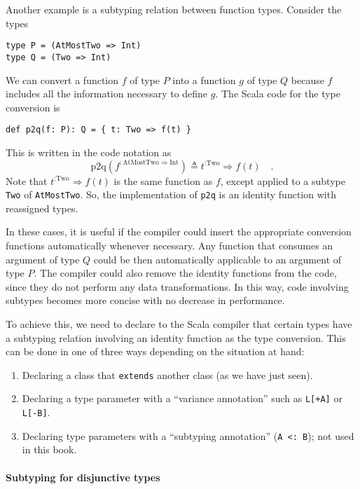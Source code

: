 Another example is a subtyping relation between function types. Consider
the types
\begin{lstlisting}
type P = (AtMostTwo => Int)
type Q = (Two => Int)
\end{lstlisting}
We can convert a function $f$ of type $P$ into a function $g$ of
type $Q$ because $f$ includes all the information necessary to define
$g$. The Scala code for the type conversion is
\begin{lstlisting}
def p2q(f: P): Q = { t: Two => f(t) }
\end{lstlisting}
This is written in the code notation as
\[
\text{p2q}(f^{:\text{AtMostTwo}\Rightarrow\text{Int}})\triangleq t^{:\text{Two}}\Rightarrow f(t)\quad.
\]
Note that $t^{:\text{Two}}\Rightarrow f(t)$ is the same function
as $f$, except applied to a subtype \lstinline!Two! of \lstinline!AtMostTwo!.
So, the implementation of \lstinline!p2q! is an identity function
with reassigned types.

In these cases, it is useful if the compiler could insert the appropriate
conversion functions automatically whenever necessary. Any function
that consumes an argument of type $Q$ could be then automatically
applicable to an argument of type $P$. The compiler could also remove
the identity functions from the code, since they do not perform any
data transformations. In this way, code involving subtypes becomes
more concise with no decrease in performance.

To achieve this, we need to declare to the Scala compiler that certain
types have a subtyping relation involving an identity function as
the type conversion. This can be done in one of three ways depending
on the situation at hand:
\begin{enumerate}
\item Declaring a class that \lstinline!extends! another class (as we have
just seen).
\item Declaring a type parameter with a ``variance annotation'' such as
\lstinline!L[+A]! or \lstinline!L[-B]!.
\item Declaring type parameters with a ``subtyping annotation'' (\lstinline!A <: B!);
not used in this book.
\end{enumerate}

\paragraph{Subtyping for disjunctive types }

